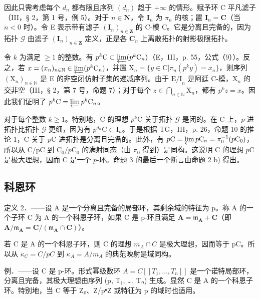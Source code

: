 因此只需考虑每个 \(d_{n}\) 都有限且序列 \((d_{n})\) 趋于 \(+\infty\) 的情形。赋予环 C 平凡滤子（III，§ 2，第 1 号，例 5）。对于 \(n\in\mathbf{N}\)，令 \(\mathbf{I}_{n}\) 为 \(\pi_{n}\) 的核；置 \(\mathbf{I}_{n}=\mathbf{C}\)（当 \(n<0\) 时）。令 E 表示带有滤子 \((\mathbf{I}_{n})_{n\in\mathbf{Z}}\) 的 C-模 C。它是分离且完备的，因为拓扑 \(\mathcal{G}\) 由滤子 \((\mathbf{I}_{n})_{n\in\mathbf{Z}}\) 定义，正是各 \(\mathbf{C}_{n}\) 上离散拓扑的射影极限拓扑。

令 \(k\) 为满足 \(\geqslant 1\) 的整数。有 \(p^{k}\mathrm{C} \subset \varprojlim (p^{k}\mathrm{C}_{n})\)（E，III，p. 55，公式（9））。反之，若 \(x = (x_{n})_{n \in \mathbb{N}} \in \varprojlim (p^{k}\mathrm{C}_{n})\)，并置 \(\mathrm{X}_{n} = \{y \in \mathrm{C}|\pi_{n}(p^{k}y) = x_{n}\}\)，则序列 \((\mathrm{X}_{n})_{n \in \mathbb{N}}\) 是 E 的非空闭仿射子集的递减序列。由于 \(\mathrm{E / I}_{n}\) 是阿廷 C-模，\(\mathrm{X}_{n}\) 的交非空（III，§ 2，第 7 号，命题 7）；对于每个 \(z \in \bigcap_{n \in \mathbb{N}} \mathrm{X}_{n}\)，都有 \(p^{k}z = x\)。因此我们证明了 \(p^{k}\mathrm{C} = \varprojlim p^{k}\mathrm{C}_{n}\)。

对于每个整数 \(k \geqslant 1\)。特别地，C 的理想 \(p^{k}\text{C}\) 关于拓扑 \(\mathcal{G}\) 是闭的。在 C 上，\(p\)-进拓扑比拓扑 \(\mathcal{G}\) 更细，因为有 \(p^{d_{n}}\text{C} \subset \text{I}_{n}\)。于是根据 TG，III，p. 26，命题 10 的推论 1，C 关于 \(p\text{C}\)-进拓扑是分离且完备的。此外，有 \(p\text{C} = \varprojlim p\text{C}_{n} = \pi_{0}^{-1}(p\text{C}_{0})\)，所以从 C/pC 到 \(\text{C}_{0}/p\text{C}_{0}\) 的满射同态（由 \(\pi_{0}\) 得到）是同构。这说明 C 的理想 \(p\text{C}\) 是极大理想，因而 C 是一个 \(p\)-环。命题 3 的最后一个断言由命题 2 b) 得出。

\subsection{科恩环}

定义 2．——设 A 是一个分离且完备的局部环，其剩余域的特征为 p。称 A 的一个子环 C 为 A 的一个科恩子环，如果 C 是 p-环且满足 \(\mathbf{A} = \mathfrak{m}_{\mathbf{A}} + \mathbf{C}\)（即 \(\mathbf{A}/\mathfrak{m}_{\mathbf{A}} = \mathbf{C}/(\mathfrak{m}_{\mathbf{A}} \cap \mathbf{C})\)）。

若 C 是 A 的一个科恩子环，则 C 的理想 \(m_{A} \cap C\) 是极大理想，因而等于 pC。所以从 \(\kappa_{C} = C/pC\) 到 \(\kappa_{A} = A/m_{A}\) 的典范映射是域同构。

例．——设 C 是 p-环。形式幂级数环 \(A = C[[T_{1}, \ldots, T_{n}]]\) 是一个诺特局部环，分离且完备，其极大理想由序列 (p, T₁, \ldots, Tₙ) 生成。显然 C 是 A 的一个科恩子环。特别地，当 C 等于 Zₚ、Z/pⁿZ 或特征为 p 的域时也适用。

